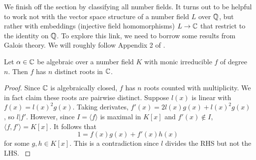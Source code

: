 We finish off the section by classifying all number fields. It turns out to be helpful to work not with the vector space structure of a number field $L$ over $\mathbb{Q}$, but rather with embeddings (injective field homomorphisms) $L\rightarrow \mathbb{C}$ that restrict to the identity on $\mathbb{Q}$. To explore this link, we need to borrow some results from Galois theory. We will roughly follow Appendix 2 of \cite{NumberFields}. 




\begin{lemma}\label{monic-irreducible-has-all-roots}
Let $\alpha\in \mathbb{C}$ be algebraic over a number field $K$ with monic irreducible $f$ of degree $n$. Then $f$ has $n$ distinct roots in $\mathbb{C}$.
\end{lemma}
\begin{proof}
Since $\mathbb{C}$ is algebraically closed, $f$ has $n$ roots counted with multiplicity. We in fact claim these roots are pairwise distinct. Suppose $l(x)$ is linear with $f(x)=l(x)^2g(x)$. Taking derivates, $f'(x)=2l(x)g(x)+l(x)^2g(x)$, so $l|f'$. However, since $I=\langle f \rangle$ is maximal in $K[x]$ and $f'(x)\not \in I$, $\langle f, f'\rangle=K[x]$. It follows that $$1=f(x)g(x)+f'(x)h(x)$$ for some $g,h\in K[x]$. This is a contradiction since $l$ divides the RHS but not the LHS. \cite{NumberFields}
\end{proof}

